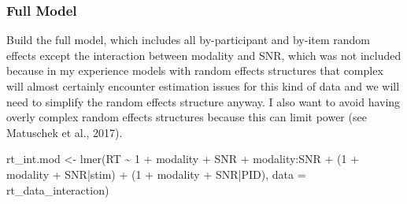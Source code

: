 \documentclass[
]{article}
\newenvironment{Shaded}{\begin{snugshade}}{\end{snugshade}}
\newcommand{\AttributeTok}[1]{\textcolor[rgb]{0.77,0.63,0.00}{#1}}
\newcommand{\DecValTok}[1]{\textcolor[rgb]{0.00,0.00,0.81}{#1}}
\newcommand{\FunctionTok}[1]{\textcolor[rgb]{0.00,0.00,0.00}{#1}}
\newcommand{\NormalTok}[1]{#1}
\newcommand{\OtherTok}[1]{\textcolor[rgb]{0.56,0.35,0.01}{#1}}
\newcommand{\SpecialCharTok}[1]{\textcolor[rgb]{0.00,0.00,0.00}{#1}}
\newcommand{\StringTok}[1]{\textcolor[rgb]{0.31,0.60,0.02}{#1}}
\begin{document}
\begin{Shaded}
\end{Shaded}

\hypertarget{full-model}{%
\subsubsection{Full Model}\label{full-model}}

Build the full model, which includes all by-participant and by-item
random effects except the interaction between modality and SNR, which
was not included because in my experience models with random effects
structures that complex will almost certainly encounter estimation
issues for this kind of data and we will need to simplify the random
effects structure anyway. I also want to avoid having overly complex
random effects structures because this can limit power (see Matuschek et
al., 2017).

\begin{Shaded}
\begin{Highlighting}[]
\NormalTok{rt\_int.mod }\OtherTok{\textless{}{-}} \FunctionTok{lmer}\NormalTok{(RT }\SpecialCharTok{\textasciitilde{}} \DecValTok{1} \SpecialCharTok{+}\NormalTok{ modality }\SpecialCharTok{+}\NormalTok{ SNR }\SpecialCharTok{+}\NormalTok{ modality}\SpecialCharTok{:}\NormalTok{SNR }\SpecialCharTok{+}
\NormalTok{                     (}\DecValTok{1} \SpecialCharTok{+}\NormalTok{ modality }\SpecialCharTok{+}\NormalTok{ SNR}\SpecialCharTok{|}\NormalTok{stim) }\SpecialCharTok{+}\NormalTok{ (}\DecValTok{1} \SpecialCharTok{+}\NormalTok{ modality }\SpecialCharTok{+}\NormalTok{ SNR}\SpecialCharTok{|}\NormalTok{PID), }
                   \AttributeTok{data =}\NormalTok{ rt\_data\_interaction)}
\end{Highlighting}
\end{Shaded}
\end{document}
